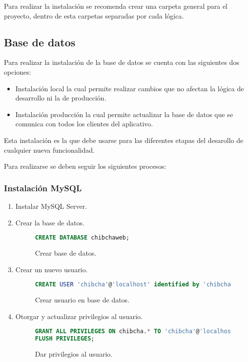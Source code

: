 Para realizar la instalación se recomenda crear una carpeta general para el proyecto, dentro de esta carpetas separadas por cada lógica.

\subsection{Base de datos}
Para realizar la instalación de la base de datos se cuenta con las siguientes dos opciones:
\begin{itemize}
    \item Instalación local la cual permite realizar cambios que no afectan la lógica de desarrollo ni la de producción.
    \item Instalación producción la cual permite actualizar la base de datos que se comunica con todos los clientes del aplicativo.
\end{itemize}

Esta instalación es la que debe usarse para las diferentes etapas del desarollo de cualquier nueva funcionalidad.

Para realizarse se deben seguir los siguientes procesos:

\subsubsection*{Instalación MySQL}
\begin{enumerate}
	\item Instalar MySQL Server.
	\item Crear la base de datos.

	\begin{figure}
	\begin{lstlisting}[language=sql]
CREATE DATABASE chibchaweb;
        \end{lstlisting}
        \caption{Crear base de datos.}
        \label{fig:crear-bd}
        \end{figure}
    \item Crear un nuevo usuario.

    \begin{figure}
    \begin{lstlisting}[language=sql]
CREATE USER 'chibcha'@'localhost' identified by 'chibcha';
        \end{lstlisting}
        \caption{Crear usuario en base de datos.}
        \label{fig:crear-usuario}
        \end{figure}
	\item Otorgar y actualizar privilegios al usuario.

	\begin{figure}
	\begin{lstlisting}[language=sql]
GRANT ALL PRIVILEGES ON chibcha.* TO 'chibcha'@'localhost';
FLUSH PRIVILEGES;
        \end{lstlisting}
        \caption{Dar privilegios al usuario.}
        \label{fig:dar-privilegios}
        \end{figure}
\end{enumerate}

